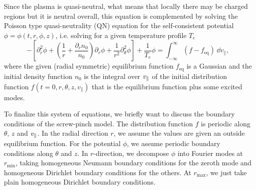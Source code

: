 Since the plasma is quasi-neutral, what means that locally there may be charged regions but it is neutral overall, this equation is complemented by solving the Poisson type quasi-neutrality (QN) equation for the self-consistent potential $\phi = \phi(t, r, \phi, z)$, i.e. solving for a given temperature profile $T_e$
\begin{equation}
- \left[\partial_r^2 \phi + \left( \frac{1}{r} + \frac{\partial_r n_0}{n_0}\right)\partial_r \phi + \frac{1}{r^2} \partial_\theta^2 \phi \right] + \frac{1}{T_e} \phi = \int_{-\infty}^{\infty} (f - f_\text{eq}) \ \dd v_\parallel, \label{eq:qn}
\end{equation}
where the given (radial symmetric) equilibrium function $f_\text{eq}$ is a Gaussian and the initial density function $n_0$ is the integral over $v_\parallel$ of the initial distribution function $f(t=0, r, \theta, z, v_\parallel)$ that is the equilibrium function plus some excited modes.




To finalize this system of equations, we briefly want to discuss the boundary conditions of the screw-pinch model. The distribution function $f$ is periodic along $\theta$, $z$ and $v_\parallel$. In the radial direction $r$, we assume the values are given an outside equilibrium function. For the potential $\phi$, we assume periodic boundary conditions along $\theta$ and $z$. In $r$-direction, we decompose $\phi$ into Fourier modes at $r_\text{min}$, taking homogeneous Neumann boundary conditions for the zeroth mode and homogeneous Dirichlet boundary conditions for the others. At $r_\text{max}$, we just take plain homogeneous Dirichlet boundary conditions.\\


